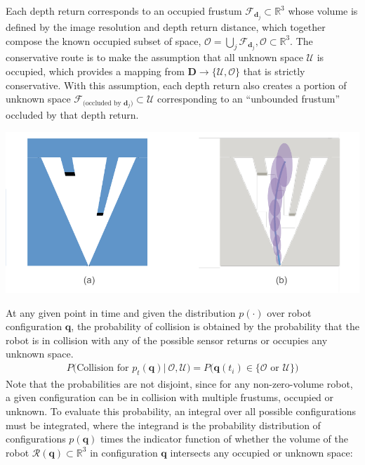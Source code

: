 \documentclass{llncs}
\begin{document}
Each depth return corresponds to an occupied frustum $\mathcal{F}_{{\mathbf{d}_j}} \subset \mathbb{R}^3$ whose volume is defined by the image resolution and depth return distance, which together compose the known occupied subset of space, $\mathcal{O} = \bigcup_j \mathcal{F}_{{\mathbf{d}_j}}, \mathcal{O} \subset \mathbb{R}^3$.  The conservative route is to make the assumption that all unknown space $\mathcal{U}$ is occupied, which provides a mapping from $\mathbf{D} \rightarrow \{\mathcal{U}, \mathcal{O} \}$ that is strictly conservative.  With this assumption, each depth return also creates a portion of unknown space $\mathcal{F}_{\text{(occluded by } {\mathbf{d}_j})} \subset \mathcal{U}$ corresponding to an ``unbounded frustum'' occluded by that depth return.  
%
\begin{center}
  \includegraphics[keepaspectratio=true,scale=0.6]{images/frustum.pdf}
  \label{frustum}
\end{center}
%
At any given point in time and given the distribution $p(\cdot)$ over robot configuration $\mathbf{q}$, the probability of collision is obtained by the probability that the robot is in collision with any of the possible sensor returns or occupies any unknown space. 
%
\begin{equation}
\begin{aligned}
P \big( \text{Collision for } p_t(\mathbf{q}) | \ \mathcal{O}, \mathcal{U}  \big) = P\big( \mathbf{q}(t_i) \in \{ \mathcal{O} \text{ or } \mathcal{U} \})
\end{aligned}
\end{equation}
%
Note that the probabilities are not disjoint, since for any non-zero-volume robot, a given configuration can be in collision with multiple frustums, occupied or unknown.  To evaluate this probability, an integral over all possible configurations must be integrated, where the integrand is the probability distribution of configurations $p(\mathbf{q})$ times the indicator function of whether the volume of the robot $\mathcal{R}(\mathbf{q}) \subset \mathbb{R}^3$ in configuration $\mathbf{q}$ intersects any occupied or unknown space:
\end{document}
